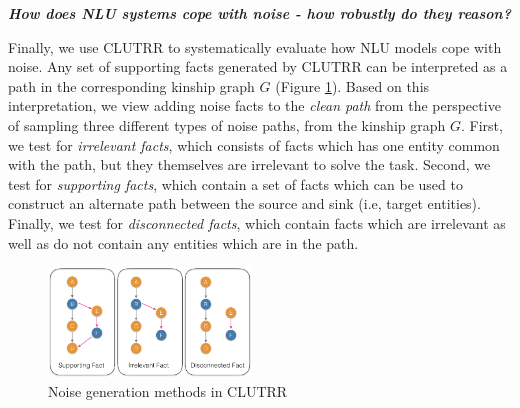 \documentclass[12pt]{article}
\newcommand{\xit}[1]{{\noindent\textbf{\textit{#1}}}}
\begin{document}
\xit{How does NLU systems cope with noise - how robustly do they reason?}

Finally, we use CLUTRR to systematically evaluate how NLU models cope with noise.
Any set of supporting facts generated by CLUTRR can be interpreted as a path in the corresponding kinship graph $G$ (Figure \ref{fig:clutrr_data_noise}).
Based on this interpretation, we view adding noise facts to the \textit{clean path} from the perspective of sampling three different types of noise paths, from the kinship graph $G$. First, we test for \textit{irrelevant facts}, which consists of facts which has one entity common with the path, but they themselves are irrelevant to solve the task. Second, we test for \textit{supporting facts}, which contain a set of facts which can be used to construct an alternate path between the source and sink (i.e, target entities). Finally, we test for \textit{disconnected facts}, which contain facts which are irrelevant as well as do not contain any entities which are in the path.

\begin{figure}
\begin{center}
  \includegraphics[width=0.48\textwidth]{images/clutrr_noise.png}
\end{center}
\caption{Noise generation methods in CLUTRR}
\label{fig:clutrr_data_noise}
\end{figure}



\end{document}
